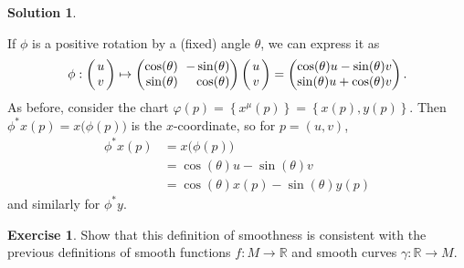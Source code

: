 \documentclass[11pt, a4paper]{report}
\theoremstyle{definition}
\newtheorem{exercise}{Exercise}[part]
\newtheorem{solution}{Solution}[part]
\newenvironment{ex}{\begin{exercise}}{\end{exercise}\pagebreak[1]}
\newenvironment{sol}{\begin{solution}}{\end{solution}\pagebreak[3]}
\newcommand*{\m}{\ensuremath\:\, \mathllap{-}}
\begin{document}
\begin{sol}\label{sol:pullbackrotation}

If $\phi$ is a positive rotation by a (fixed) angle $\theta$, we can express it as
\[
    \phi: \begin{pmatrix}
            u \\ \,v\,
        \end{pmatrix}
        \mapsto
        \begin{pmatrix*}[r]
            \cos(\theta) & \m\sin(\theta) \\
            \sin(\theta) & \cos(\theta)
        \end{pmatrix*}
        \begin{pmatrix}
            u \\ \,v\,
        \end{pmatrix}
        =
        \begin{pmatrix}
            \cos(\theta) u - \sin(\theta) v \\
            \sin(\theta) u + \cos(\theta) v
        \end{pmatrix}.
\]
As before, consider the chart $\varphi(p) = \left\{x^\mu(p)\right\} = \left\{x(p), y(p)\right\}$.
Then $\phi^* x(p) = x\bigl(\phi(p)\bigr)$ is the $x$-coordinate, so for $p = (u, v)$,
\begin{align*}
    \phi^* x(p) &= x \bigl( \phi(p) \bigr) \\
                &= \cos(\theta) u - \sin(\theta) v \\
                &= \cos(\theta) x(p) - \sin(\theta) y(p)
\end{align*}
and similarly for $\phi^* y$.

\end{sol}

\begin{ex}

Show that this definition of smoothness is consistent with the previous definitions of smooth functions $f: M \to \mathbb{R}$ and smooth curves $\gamma: \mathbb{R} \to M$.

\end{ex}
\end{document}
